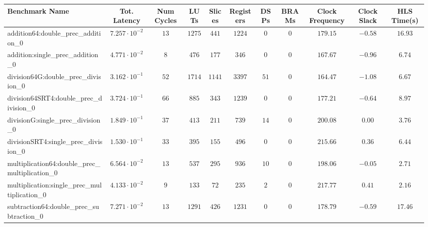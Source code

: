 \begin{tabular}{|l|c|c|c|c|c|c|c|c|c|c|}
\hline
Benchmark Name                                   & Tot. Latency            & Num Cycles & LUTs     & Slices   & Registers & DSPs   & BRAMs & Clock Frequency & Clock Slack & HLS Time(s) \\
\hline
addition64:double\_prec\_addition\_0             & $ 7.257 \cdot 10^{-2} $ & $ 13     $ & $ 1275 $ & $ 441  $ & $ 1224  $ & $ 0  $ & $ 0 $ & $ 179.15      $ & $ -0.58   $ & $ 16.93   $ \\
addition:single\_prec\_addition\_0               & $ 4.771 \cdot 10^{-2} $ & $ 8      $ & $ 476  $ & $ 177  $ & $ 346   $ & $ 0  $ & $ 0 $ & $ 167.67      $ & $ -0.96   $ & $ 6.74    $ \\
division64G:double\_prec\_division\_0            & $ 3.162 \cdot 10^{-1} $ & $ 52     $ & $ 1714 $ & $ 1141 $ & $ 3397  $ & $ 51 $ & $ 0 $ & $ 164.47      $ & $ -1.08   $ & $ 6.67    $ \\
division64SRT4:double\_prec\_division\_0         & $ 3.724 \cdot 10^{-1} $ & $ 66     $ & $ 885  $ & $ 343  $ & $ 1239  $ & $ 0  $ & $ 0 $ & $ 177.21      $ & $ -0.64   $ & $ 8.97    $ \\
divisionG:single\_prec\_division\_0              & $ 1.849 \cdot 10^{-1} $ & $ 37     $ & $ 413  $ & $ 211  $ & $ 739   $ & $ 14 $ & $ 0 $ & $ 200.08      $ & $ 0.00    $ & $ 3.76    $ \\
divisionSRT4:single\_prec\_division\_0           & $ 1.530 \cdot 10^{-1} $ & $ 33     $ & $ 395  $ & $ 155  $ & $ 496   $ & $ 0  $ & $ 0 $ & $ 215.66      $ & $ 0.36    $ & $ 6.44    $ \\
multiplication64:double\_prec\_multiplication\_0 & $ 6.564 \cdot 10^{-2} $ & $ 13     $ & $ 537  $ & $ 295  $ & $ 936   $ & $ 10 $ & $ 0 $ & $ 198.06      $ & $ -0.05   $ & $ 2.71    $ \\
multiplication:single\_prec\_multiplication\_0   & $ 4.133 \cdot 10^{-2} $ & $ 9      $ & $ 133  $ & $ 72   $ & $ 235   $ & $ 2  $ & $ 0 $ & $ 217.77      $ & $ 0.41    $ & $ 2.16    $ \\
subtraction64:double\_prec\_subtraction\_0       & $ 7.271 \cdot 10^{-2} $ & $ 13     $ & $ 1291 $ & $ 426  $ & $ 1231  $ & $ 0  $ & $ 0 $ & $ 178.79      $ & $ -0.59   $ & $ 17.46   $ \\

\end{tabular}
